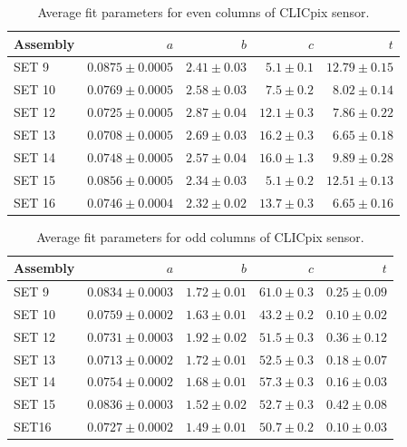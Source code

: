 \begin{table}[h!]
\centering
\begin{tabular}{ l r r r r}
\hline
Assembly & $a$ & $b$ & $c$ & $t$ \\ 
\hline
SET 9   & $0.0875 \pm 0.0005$ & $2.41 \pm 0.03$ & $5.1 \pm 0.1$ & $12.79 \pm 0.15$ \\
SET 10 & $0.0769 \pm 0.0005$ & $2.58 \pm 0.03$ & $7.5 \pm 0.2$ & $8.02 \pm 0.14$ \\
SET 12 & $0.0725 \pm 0.0005$ & $2.87 \pm 0.04$ & $12.1 \pm 0.3$ & $7.86 \pm 0.22$  \\
SET 13 & $0.0708 \pm 0.0005$ & $2.69 \pm 0.03$ & $16.2 \pm 0.3$ & $6.65 \pm 0.18$ \\
SET 14 & $0.0748 \pm 0.0005$ & $2.57 \pm 0.04$ & $16.0 \pm 1.3$ & $9.89 \pm 0.28$ \\
SET 15 & $0.0856 \pm 0.0005$ & $2.34 \pm 0.03$ & $5.1 \pm 0.2$ & $12.51 \pm 0.13$ \\
SET 16 & $0.0746 \pm 0.0004$ & $2.32 \pm 0.02$ & $13.7 \pm 0.3$ & $6.65\pm 0.16$ \\
\hline
\end{tabular}
\caption[Average fit parameters for even columns of CLICpix sensor.]{Average fit parameters for even columns of CLICpix sensor.}
\label{table:clicpixfitparamseven}
\end{table}

\begin{table}[h!]
\centering
\begin{tabular}{ l r r r r}
\hline
Assembly & $a$ & $b$ & $c$ & $t$ \\ 
\hline
SET 9   & $0.0834 \pm 0.0003$ & $1.72 \pm 0.01$ & $61.0 \pm 0.3$ & $0.25 \pm 0.09$ \\
SET 10 & $0.0759 \pm 0.0002$ & $1.63 \pm 0.01$ & $43.2 \pm 0.2$ & $0.10 \pm 0.02$ \\
SET 12 & $0.0731 \pm 0.0003$ & $1.92 \pm 0.02$ & $51.5 \pm 0.3$ & $0.36 \pm 0.12$ \\
SET 13 & $0.0713 \pm 0.0002$ & $1.72 \pm 0.01$ & $52.5 \pm 0.3$ & $0.18 \pm 0.07$ \\
SET 14 & $0.0754 \pm 0.0002$ & $1.68 \pm 0.01$ & $57.3 \pm 0.3$ & $0.16 \pm 0.03$ \\
SET 15 & $0.0836 \pm 0.0003$ & $1.52 \pm 0.02$ & $52.7 \pm 0.3$ & $0.42 \pm 0.08$ \\
SET16  & $0.0727 \pm 0.0002$ & $1.49 \pm 0.01$ & $50.7 \pm 0.2$ & $0.10 \pm 0.03$ \\
\hline
\end{tabular}
\caption[Average fit parameters for odd columns of CLICpix sensor.]{Average fit parameters for odd columns of CLICpix sensor.}
\label{table:clicpixfitparamsodd}
\end{table}

